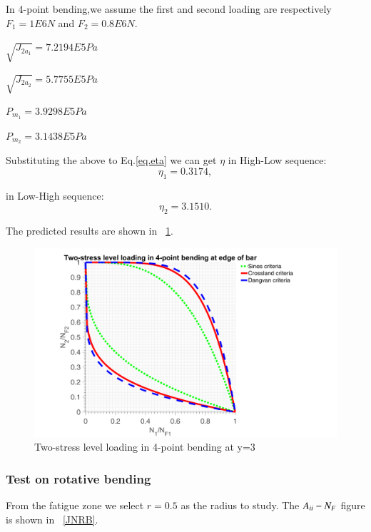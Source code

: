\documentclass[3p,times,procedia,number]{elsarticle}
\newcommand{\figref}[1]{\figurename~\ref{#1}}
\begin{document}
In 4-point bending,we assume the first and second loading are respectively $F_1=1E6 N$ and $F_2=0.8E6 N$. 

\vspace{6pt}
$\sqrt{J_{2a_1}}=7.2194E5 Pa$

\vspace{6pt}
$\sqrt{J_{2a_2}}=5.7755E5 Pa$

\vspace{6pt}
$P_{m_1}=3.9298E5 Pa$

\vspace{6pt}
$P_{m_2}=3.1438E5 Pa$

Substituting the above to Eq.\eqref{eq.eta} we can get $\eta$ in High-Low sequence:
$$\eta_1=0.3174,$$

in Low-High sequence:
$$\eta_2=3.1510.$$

The predicted results are shown in \figref{2stressB}.

\begin{figure}[h!]
	\centering
	\includegraphics[width=\textwidth]{figures//2stressB.png} 
	\caption{Two-stress level loading in 4-point bending at y=3}
	\label{2stressB}
\end{figure}

\newpage
\subsubsection{Test on rotative bending}
From the fatigue zone we select $r=0.5$ as the radius to study. 
The $A_{\uppercase\expandafter{\romannumeral2}}-N_F$ figure is shown in \figref{JNRB}.
\end{document}
